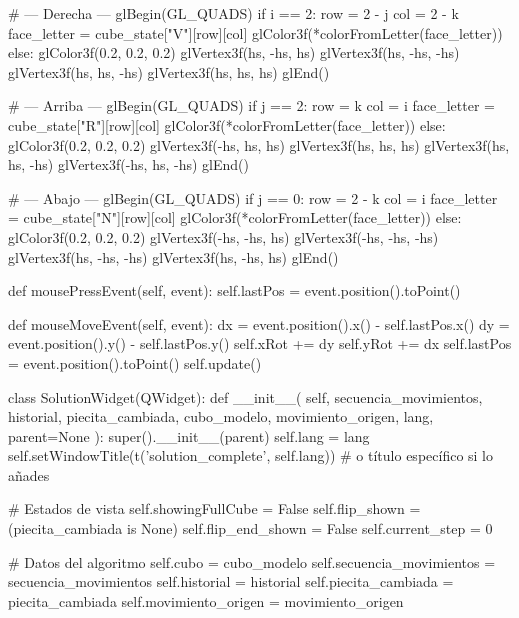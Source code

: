         # --- Derecha ---
        glBegin(GL_QUADS)
        if i == 2:
            row = 2 - j
            col = 2 - k
            face_letter = cube_state["V"][row][col]
            glColor3f(*colorFromLetter(face_letter))
        else:
            glColor3f(0.2, 0.2, 0.2)
        glVertex3f(hs, -hs, hs)
        glVertex3f(hs, -hs, -hs)
        glVertex3f(hs, hs, -hs)
        glVertex3f(hs, hs, hs)
        glEnd()

        # --- Arriba ---
        glBegin(GL_QUADS)
        if j == 2:
            row = k
            col = i
            face_letter = cube_state["R"][row][col]
            glColor3f(*colorFromLetter(face_letter))
        else:
            glColor3f(0.2, 0.2, 0.2)
        glVertex3f(-hs, hs, hs)
        glVertex3f(hs, hs, hs)
        glVertex3f(hs, hs, -hs)
        glVertex3f(-hs, hs, -hs)
        glEnd()

        # --- Abajo ---
        glBegin(GL_QUADS)
        if j == 0:
            row = 2 - k
            col = i
            face_letter = cube_state["N"][row][col]
            glColor3f(*colorFromLetter(face_letter))
        else:
            glColor3f(0.2, 0.2, 0.2)
        glVertex3f(-hs, -hs, hs)
        glVertex3f(-hs, -hs, -hs)
        glVertex3f(hs, -hs, -hs)
        glVertex3f(hs, -hs, hs)
        glEnd()

    def mousePressEvent(self, event):
        self.lastPos = event.position().toPoint()

    def mouseMoveEvent(self, event):
        dx = event.position().x() - self.lastPos.x()
        dy = event.position().y() - self.lastPos.y()
        self.xRot += dy
        self.yRot += dx
        self.lastPos = event.position().toPoint()
        self.update()


class SolutionWidget(QWidget):
    def __init__(
        self,
        secuencia_movimientos, historial,
        piecita_cambiada, cubo_modelo,
        movimiento_origen, lang,
        parent=None
    ):
        super().__init__(parent)
        self.lang = lang
        self.setWindowTitle(t('solution_complete', self.lang))  # o título específico si lo añades

        # Estados de vista
        self.showingFullCube = False
        self.flip_shown = (piecita_cambiada is None)
        self.flip_end_shown = False
        self.current_step = 0

        # Datos del algoritmo
        self.cubo = cubo_modelo
        self.secuencia_movimientos = secuencia_movimientos
        self.historial = historial
        self.piecita_cambiada = piecita_cambiada
        self.movimiento_origen = movimiento_origen

